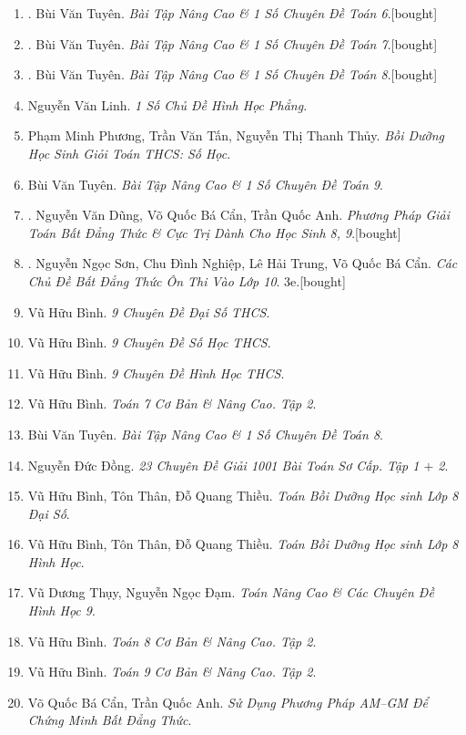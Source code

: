 \documentclass{article}
\begin{document}
\begin{enumerate}
	\item \cite{Tuyen_Toan_6}. Bùi Văn Tuyên. \textit{Bài Tập Nâng Cao \& 1 Số Chuyên Đề Toán 6}.\hfill\textsf{[bought]}
	\item \cite{Tuyen_Toan_7}. Bùi Văn Tuyên. \textit{Bài Tập Nâng Cao \& 1 Số Chuyên Đề Toán 7}.\hfill\textsf{[bought]}
	\item \cite{Tuyen_Toan_8}. Bùi Văn Tuyên. \textit{Bài Tập Nâng Cao \& 1 Số Chuyên Đề Toán 8}.\hfill\textsf{[bought]}
	\item Nguyễn Văn Linh. \textit{1 Số Chủ Đề Hình Học Phẳng}.
	\item Phạm Minh Phương, Trần Văn Tấn, Nguyễn Thị Thanh Thủy. \textit{Bồi Dưỡng Học Sinh Giỏi Toán THCS: Số Học}.
	\item Bùi Văn Tuyên. \textit{Bài Tập Nâng Cao \& 1 Số Chuyên Đề Toán 9}.
	\item \cite{Dung_Can_Anh2020}. Nguyễn Văn Dũng, Võ Quốc Bá Cẩn, Trần Quốc Anh. \textit{Phương Pháp Giải Toán Bất Đẳng Thức \& Cực Trị Dành Cho Học Sinh 8, 9}.\hfill\textsf{[bought]}
	\item \cite{Son_Nghiep_Trung_Can2021}. Nguyễn Ngọc Sơn, Chu Đình Nghiệp, Lê Hải Trung, Võ Quốc Bá Cẩn. \textit{Các Chủ Đề Bất Đẳng Thức Ôn Thi Vào Lớp 10}. 3e.\hfill\textsf{[bought]}
	\item Vũ Hữu Bình. \textit{9 Chuyên Đề Đại Số THCS}.
	\item Vũ Hữu Bình. \textit{9 Chuyên Đề Số Học THCS}.
	\item Vũ Hữu Bình. \textit{9 Chuyên Đề Hình Học THCS}.
	\item Vũ Hữu Bình. \textit{Toán 7 Cơ Bản \& Nâng Cao. Tập 2}.
	\item Bùi Văn Tuyên. \textit{Bài Tập Nâng Cao \& 1 Số Chuyên Đề Toán 8}.
	\item Nguyễn Đức Đồng. \textit{23 Chuyên Đề Giải 1001 Bài Toán Sơ Cấp. Tập 1 $+$ 2}.
	\item Vũ Hữu Bình, Tôn Thân, Đỗ Quang Thiều. \textit{Toán Bồi Dưỡng Học sinh Lớp 8 Đại Số}.
	\item Vũ Hữu Bình, Tôn Thân, Đỗ Quang Thiều. \textit{Toán Bồi Dưỡng Học sinh Lớp 8 Hình Học}.
	\item Vũ Dương Thụy, Nguyễn Ngọc Đạm. \textit{Toán Nâng Cao \& Các Chuyên Đề Hình Học 9}.
	\item Vũ Hữu Bình. \textit{Toán 8 Cơ Bản \& Nâng Cao. Tập 2}.
	\item Vũ Hữu Bình. \textit{Toán 9 Cơ Bản \& Nâng Cao. Tập 2}.
	\item Võ Quốc Bá Cẩn, Trần Quốc Anh. \textit{Sử Dụng Phương Pháp AM--GM Để Chứng Minh Bất Đẳng Thức}.

\end{enumerate}
\end{document}
